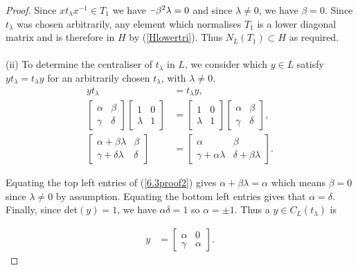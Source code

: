 \documentclass[a4paper , 11pt]{book}
\newcommand{\minus}{\scalebox{0.75}[1.0]{$-$}}
\theoremstyle{definition}
\theoremstyle{remark}
\begin{document}
\begin{proof}
Since $x t_\lambda x^{-1} \in T_1$ we have $\minus \beta^2  \lambda = 0$ and since $\lambda \neq 0$, we have $\beta = 0$. Since $t_\lambda$ was chosen arbitrarily, any element which normalises $T_1$ is a lower diagonal matrix and is therefore in $H$ by (\ref{Hlowertri}). Thus $N_L(T_1) \subset H$ as required. \\
\\
(ii) To determine the centraliser of $t_\lambda$ in $L$, we consider which $y \in L$ satisfy $y t_\lambda = t_\lambda y$ for an arbitrarily chosen $t_\lambda$, with $\lambda \neq 0$. \\
\vspace{-0.5mm}
\begin{align}\label{6.3proof2} y t_\lambda &= t_\lambda y, \nonumber \\[1.5ex]
\begin{bmatrix} \alpha & \beta \\ \gamma & \delta \end{bmatrix} \begin{bmatrix} 1 & 0 \\ \lambda & 1 \end{bmatrix} &= \begin{bmatrix} 1 & 0 \\ \lambda & 1 \end{bmatrix} \begin{bmatrix} \alpha & \beta \\ \gamma & \delta \end{bmatrix}, \nonumber \\[1.5ex]
\begin{bmatrix} \alpha + \beta \lambda & \beta \\ \gamma + \delta \lambda & \delta \end{bmatrix} &= \begin{bmatrix} \alpha & \beta \\ \gamma +  \alpha \lambda & \delta + \beta \lambda \end{bmatrix}.
\end{align}
\vspace{.5mm}

Equating the top left entries of (\ref{6.3proof2}) gives $\alpha + \beta \lambda = \alpha$ which means $\beta = 0$ since $\lambda \neq 0$ by assumption. Equating the bottom left entries gives that $\alpha = \delta$. Finally, since det$(y) = 1$, we have $\alpha \delta = 1$ so $\alpha = \pm 1$. Thus a $y \in C_L(t_\lambda)$ is

\begin{align*} y &= \begin{bmatrix} \alpha & 0 \\ \gamma & \alpha \end{bmatrix}. \tag{where $\alpha = \pm 1$}
\end{align*}


\end{proof}
\end{document}
